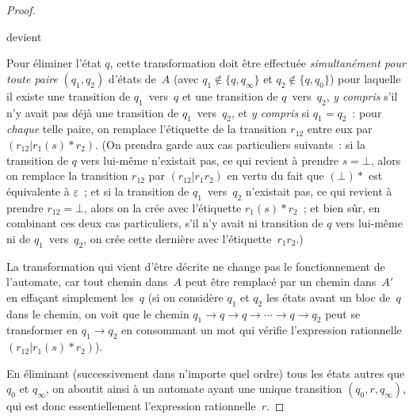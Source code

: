 \documentclass[12pt,a4paper]{article}
\theoremstyle{definition}
\begin{document}
\begin{proof}
\begin{center}
\quad devient\quad
{}
\end{center}

Pour éliminer l'état $q$, cette transformation doit être effectuée
\emph{simultanément pour toute paire} $(q_1,q_2)$ d'états de $A$ (avec
$q_1\not\in\{q,q_\infty\}$ et $q_2\not\in\{q,q_0\}$) pour laquelle il
existe une transition de $q_1$ vers $q$ et une transition de
$q$ vers $q_2$, \emph{y compris} s'il n'y avait pas déjà une
transition de $q_1$ vers $q_2$, et \emph{y compris} si $q_1=q_2$ :
pour \emph{chaque} telle paire, on remplace l'étiquette de la
transition $r_{12}$ entre eux par $(r_{12}|r_1(s){*}r_2)$.  (On
prendra garde aux cas particuliers suivants : si la transition de $q$
vers lui-même n'existait pas, ce qui revient à prendre $s=\bot$, alors
on remplace la transition $r_{12}$ par $(r_{12}|r_1 r_2)$ en vertu du
fait que $(\bot){*}$ est équivalente à $\underline{\varepsilon}$ ; et
si la transition de $q_1$ vers $q_2$ n'existait pas, ce qui revient à
prendre $r_{12}=\bot$, alors on la crée avec l'étiquette
$r_1(s){*}r_2$ ; et bien sûr, en combinant ces deux cas particuliers,
s'il n'y avait ni transition de $q$ vers lui-même ni de
$q_1$ vers $q_2$, on crée cette dernière avec l'étiquette $r_1 r_2$.)

La transformation qui vient d'être décrite ne change pas le
fonctionnement de l'automate, car tout chemin dans $A$ peut être
remplacé par un chemin dans $A'$ en effaçant simplement les $q$ (si on
considère $q_1$ et $q_2$ les états avant un bloc de $q$ dans le
chemin, on voit que le chemin $q_1 \to q \to q \to \cdots \to q \to
q_2$ peut se transformer en $q_1 \to q_2$ en consommant un mot qui
vérifie l'expression rationnelle $(r_{12}|r_1(s){*}r_2)$).

En éliminant (successivement dans n'importe quel ordre) tous les états
autres que $q_0$ et $q_\infty$, on aboutit ainsi à un automate ayant
une unique transition $(q_0,r,q_\infty)$, qui est donc essentiellement
l'expression rationnelle $r$.
\end{proof}
\end{document}
